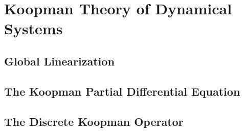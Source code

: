 \chapter{Koopman Theory of Dynamical Systems}
\label{c:koopmanTheoryOfDynamicalSystems}




\section{Global Linearization}


\section{The Koopman Partial Differential Equation}  %

\section{The Discrete Koopman Operator}
